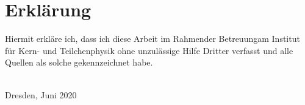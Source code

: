 \thispagestyle{empty}
\section*{Erklärung}

Hiermit erkläre ich, dass ich diese Arbeit im Rahmender Betreuungam
Institut für Kern- und Teilchenphysik ohne unzulässige Hilfe Dritter
verfasst und alle Quellen als solche gekennzeichnet habe.

\vfill

\@author \\
Dresden, Juni 2020

